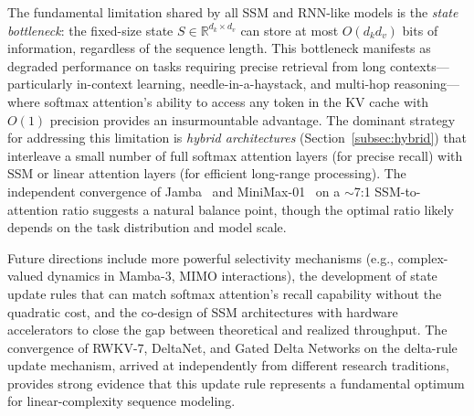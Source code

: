 The fundamental limitation shared by all SSM and RNN-like models is the \emph{state bottleneck}: the fixed-size state $S \in \mathbb{R}^{d_k \times d_v}$ can store at most $O(d_k d_v)$ bits of information, regardless of the sequence length. This bottleneck manifests as degraded performance on tasks requiring precise retrieval from long contexts---particularly in-context learning, needle-in-a-haystack, and multi-hop reasoning---where softmax attention's ability to access any token in the KV cache with $O(1)$ precision provides an insurmountable advantage. The dominant strategy for addressing this limitation is \emph{hybrid architectures} (Section~\ref{subsec:hybrid}) that interleave a small number of full softmax attention layers (for precise recall) with SSM or linear attention layers (for efficient long-range processing). The independent convergence of Jamba~\cite{lieber2024jamba_tr} and MiniMax-01~\cite{minimax2025} on a ${\sim}$7:1 SSM-to-attention ratio suggests a natural balance point, though the optimal ratio likely depends on the task distribution and model scale.

Future directions include more powerful selectivity mechanisms (e.g., complex-valued dynamics in Mamba-3, MIMO interactions), the development of state update rules that can match softmax attention's recall capability without the quadratic cost, and the co-design of SSM architectures with hardware accelerators to close the gap between theoretical and realized throughput. The convergence of RWKV-7, DeltaNet, and Gated Delta Networks on the delta-rule update mechanism, arrived at independently from different research traditions, provides strong evidence that this update rule represents a fundamental optimum for linear-complexity sequence modeling.
